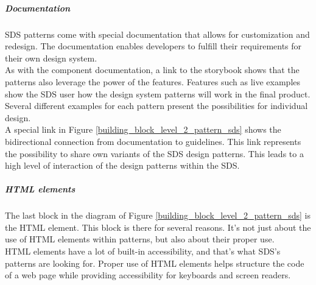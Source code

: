 \subparagraph{Documentation}
\ac{SDS} patterns come with special documentation that allows for customization and redesign. The documentation enables developers to fulfill their requirements for their own design system.\\
As with the component documentation, a link to the storybook shows that the patterns also leverage the power of the features. Features such as live examples show the \ac{SDS} user how the design system patterns will work in the final product. Several different examples for each pattern present the possibilities for individual design. \\
A special link in Figure \ref{building_block_level_2_pattern_sds} shows the bidirectional connection from documentation to guidelines. This link represents the possibility to share own variants of the \ac{SDS} design patterns. This leads to a high level of interaction of the design patterns within the \acl{SDS}.

\subparagraph{HTML elements}
The last block in the diagram of Figure \ref{building_block_level_2_pattern_sds} is the HTML element. This block is there for several reasons. It's not just about the use of HTML elements within patterns, but also about their proper use. \\
HTML elements have a lot of built-in accessibility, and that's what SDS's patterns are looking for. Proper use of HTML elements helps structure the code of a web page while providing accessibility for keyboards and screen readers. \citep{mdn_html_nodate}

